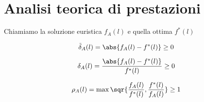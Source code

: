 \documentclass[\main/main.tex]{subfiles}
\begin{document}
\chapter{Analisi teorica di prestazioni}
Chiamiamo la soluzione euristica \(f_A(l)\) e quella ottima \(f^*(l)\)
\begin{definition}
  \[
    \tilde{\delta}_A(l) = \abs{f_A(l) - f^*(l)} \geq 0
  \]
\end{definition}

\begin{definition}
  \[
    \delta_A(l) = \frac{\abs{f_A(l) - f^*(l)}}{f^*(l)} \geq 0
  \]
\end{definition}

\begin{definition}
  \[
    \rho_A(l) = \max \sqr{\frac{f_A(l)}{f^*(l)}, \frac{f^*(l)}{f_A(l)}} \geq 1
  \]
\end{definition}
\end{document}
